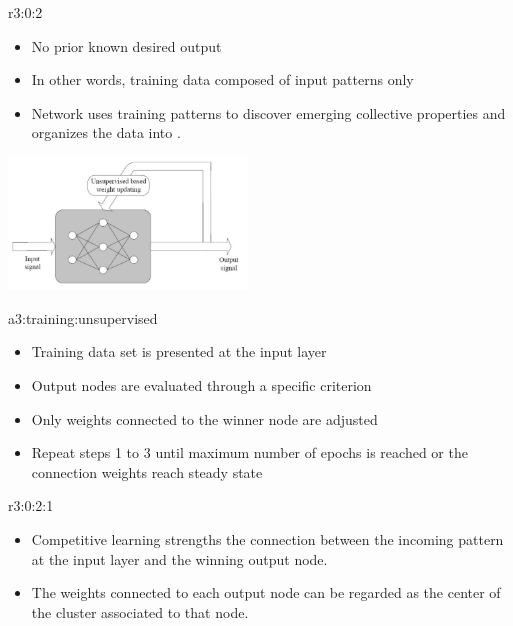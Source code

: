 \documentclass{tron}
\begin{document}
\begin{remark}{r3:0:2}	
	\begin{itemize}
		\item No prior known desired output
		\item In other words, training data composed of input patterns only
		\item Network uses training patterns to discover emerging collective properties and organizes the data into .
	\end{itemize}
	
	\includegraphics[width=240px]{Figs/Lec4/unsupervised}
	
	\begin{algo}[Training]{a3:training:unsupervised}
	\begin{itemize}
		\item Training data set is presented at the input layer 
		\item Output nodes are evaluated through a speciﬁc criterion 
		\item Only weights connected to the winner node are adjusted 
		\item Repeat steps 1 to 3 until maximum number of epochs is reached or the connection weights reach steady state
	\end{itemize}
	\end{algo}
	
	\begin{remark}[Rationale]{r3:0:2:1}
	\begin{itemize}
		\item Competitive learning strengths the connection between the incoming pattern at the input layer and the winning output node.
		\item The weights connected to each output node can be regarded as the center of the cluster associated to that node.
	\end{itemize}
	\end{remark}
\end{remark}
\end{document}
